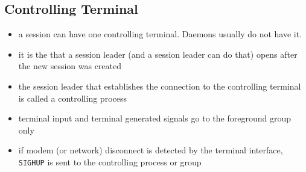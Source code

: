 \subsection{Controlling Terminal}

\begin{itemize}
\item a session can have one controlling terminal. Daemons usually do not have
it.
\item it is the  that a session leader (and a session
leader  can do that) opens after the new session was created
\item the session leader that establishes the connection to the controlling
terminal is called a controlling process
\item terminal input and terminal generated signals go to the foreground group
only
\item if modem (or network) disconnect is detected by the terminal interface,
\texttt{SIGHUP} is sent to the controlling process or group
\end{itemize}

